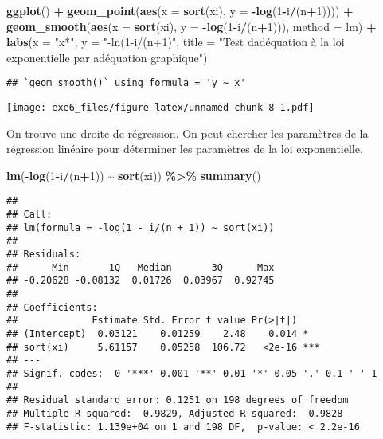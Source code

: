 \documentclass[
]{article}
\newenvironment{Shaded}{\begin{snugshade}}{\end{snugshade}}
\newcommand{\AttributeTok}[1]{\textcolor[rgb]{0.13,0.29,0.53}{#1}}
\newcommand{\DecValTok}[1]{\textcolor[rgb]{0.00,0.00,0.81}{#1}}
\newcommand{\FunctionTok}[1]{\textcolor[rgb]{0.13,0.29,0.53}{\textbf{#1}}}
\newcommand{\NormalTok}[1]{#1}
\newcommand{\SpecialCharTok}[1]{\textcolor[rgb]{0.81,0.36,0.00}{\textbf{#1}}}
\newcommand{\StringTok}[1]{\textcolor[rgb]{0.31,0.60,0.02}{#1}}
\begin{document}
\begin{Shaded}
\begin{Highlighting}[]
\FunctionTok{ggplot}\NormalTok{() }\SpecialCharTok{+} 
    \FunctionTok{geom\_point}\NormalTok{(}\FunctionTok{aes}\NormalTok{(}\AttributeTok{x =} \FunctionTok{sort}\NormalTok{(xi), }\AttributeTok{y =} \SpecialCharTok{{-}}\FunctionTok{log}\NormalTok{(}\DecValTok{1}\SpecialCharTok{{-}}\NormalTok{i}\SpecialCharTok{/}\NormalTok{(n}\SpecialCharTok{+}\DecValTok{1}\NormalTok{)))) }\SpecialCharTok{+}
    \FunctionTok{geom\_smooth}\NormalTok{(}\FunctionTok{aes}\NormalTok{(}\AttributeTok{x =} \FunctionTok{sort}\NormalTok{(xi), }\AttributeTok{y =} \SpecialCharTok{{-}}\FunctionTok{log}\NormalTok{(}\DecValTok{1}\SpecialCharTok{{-}}\NormalTok{i}\SpecialCharTok{/}\NormalTok{(n}\SpecialCharTok{+}\DecValTok{1}\NormalTok{))),}
                \AttributeTok{method =}\NormalTok{ lm) }\SpecialCharTok{+} 
    \FunctionTok{labs}\NormalTok{(}\AttributeTok{x =} \StringTok{"x*"}\NormalTok{,}
         \AttributeTok{y =} \StringTok{"{-}ln(1{-}i/(n+1)"}\NormalTok{,}
         \AttributeTok{title =} \StringTok{"Test d\textquotesingle{}adéquation à la loi exponentielle}
\StringTok{         par adéquation graphique"}\NormalTok{)}
\end{Highlighting}
\end{Shaded}

\begin{verbatim}
## `geom_smooth()` using formula = 'y ~ x'
\end{verbatim}

\texttt{[image: exe6\_files/figure-latex/unnamed-chunk-8-1.pdf]}

On trouve une droite de régression. On peut chercher les paramètres de
la régression linéaire pour déterminer les paramètres de la loi
exponentielle.

\begin{Shaded}
\begin{Highlighting}[]
\FunctionTok{lm}\NormalTok{(}\SpecialCharTok{{-}}\FunctionTok{log}\NormalTok{(}\DecValTok{1}\SpecialCharTok{{-}}\NormalTok{i}\SpecialCharTok{/}\NormalTok{(n}\SpecialCharTok{+}\DecValTok{1}\NormalTok{)) }\SpecialCharTok{\textasciitilde{}} \FunctionTok{sort}\NormalTok{(xi)) }\SpecialCharTok{\%\textgreater{}\%} \FunctionTok{summary}\NormalTok{()}
\end{Highlighting}
\end{Shaded}

\begin{verbatim}
## 
## Call:
## lm(formula = -log(1 - i/(n + 1)) ~ sort(xi))
## 
## Residuals:
##      Min       1Q   Median       3Q      Max 
## -0.20628 -0.08132  0.01726  0.03967  0.92745 
## 
## Coefficients:
##             Estimate Std. Error t value Pr(>|t|)    
## (Intercept)  0.03121    0.01259    2.48    0.014 *  
## sort(xi)     5.61157    0.05258  106.72   <2e-16 ***
## ---
## Signif. codes:  0 '***' 0.001 '**' 0.01 '*' 0.05 '.' 0.1 ' ' 1
## 
## Residual standard error: 0.1251 on 198 degrees of freedom
## Multiple R-squared:  0.9829, Adjusted R-squared:  0.9828 
## F-statistic: 1.139e+04 on 1 and 198 DF,  p-value: < 2.2e-16
\end{verbatim}
\end{document}
